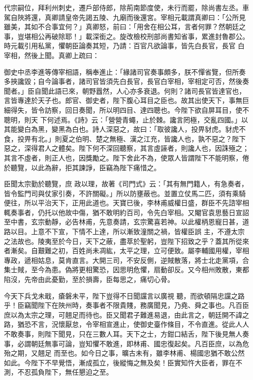 \begin{pinyinscope}
 代宗嗣位，拜利州刺史，遷戶部侍郎，除荊南節度使，未行而罷，除尚書左丞。車駕自陜將還，真卿請皇帝先謁五陵、九廟而後還宮。宰相元載謂真卿曰：「公所見雖美，其如不合事宜何？」真卿怒，前曰：「用舍在相公耳，言者何罪？然朝廷之事，豈堪相公再破除耶！」載深銜之。旋改檢校刑部尚書知省事，累進封魯郡公。時元載引用私黨，懼朝臣論奏其短，乃請：百官凡欲論事，皆先白長官，長官
 白宰相，然後上聞。真卿上疏曰：



 御史中丞李進等傳宰相語，稱奉進止：「緣諸司官奏事頗多，朕不憚省覽，但所奏多挾讒毀；自今論事者，諸司官皆須先白長官，長官白宰相，宰相定可否，然後奏聞者。」臣自聞此語已來，朝野囂然，人心亦多衰退。何則？諸司長官皆達官也，言皆專達於天子也。郎官、御史者，陛下腹心耳目之臣也。故其出使天下，事無巨細得失，皆令訪察，回日奏聞，所以明四目、達四聰也。今陛下欲自屏耳目，使不聰明，則天
 下何述焉。《詩》云：「營營青蠅，止於棘。讒言罔極，交亂四國。」以其能變白為黑，變黑為白也。詩人深惡之，故曰：「取彼讒人，投畀豺虎。豺虎不食，投畀有北。」則夏之伯明、楚之無極、漢之江充，皆讒人也，孰不惡之？陛下惡之，深得君人之體矣。陛下何不深回聽察，其言虛誣者，則讒人也，因誅殛之；其言不虛者，則正人也，因獎勵之。陛下舍此不為，使眾人皆謂陛下不能明察，倦於聽覽，以此為辭，拒其諫諍，臣竊為陛下痛惜之。



 臣聞太宗勤於聽覽，庶
 政以理，故著《司門式》云：「其有無門籍人，有急奏者，皆令監門司與仗家引奏，不許關礙。」所以防壅蔽也。並置立仗馬二匹，須有乘騎便往，所以平治天下，正用此道也。天寶已後，李林甫威權日盛，群臣不先諮宰相輒奏事者，仍托以他故中傷，猶不敢明約百司，令先白宰相。又閹官袁思藝日宣詔至中書，玄宗動靜，必告林甫，先意奏請，玄宗驚喜若神。以此權柄恩寵日甚，道路以目。上意不下宣，下情不上達，所以漸致潼關之禍，皆權臣誤
 主，不遵太宗之法故也。陵夷至於今日，天下之蔽，盡萃於聖躬，豈陛下招致之乎？蓋其所從來者漸矣。自艱難之初，百姓尚未凋紘，太平之理，立可便致。屬李輔國用權，宰相專政，遞相姑息，莫肯直言。大開三司，不安反側，逆賊散落，將士北走黨項，合集士賊，至今為患。偽將更相驚恐，因思明危懼，扇動卻反。又今相州敗散，東都陷沒，先帝由此憂勤，至於損壽，臣每思之，痛切心骨。



 今天下兵戈未戢，瘡磐未平，陛下豈得不日聞讜言以廣視
 聽，而欲頓隔忠讜之路乎！臣竊聞陛下在陜州時，奏事者不限貴賤，務廣聞見，乃堯、舜之事也。凡百臣庶以為太宗之理，可翹足而待也。臣又聞君子難進易退，由此言之，朝廷開不諱之路，猶恐不言，況懷厭怠，令宰相宣進止，使御史臺作條目，不令直進。從此人人不敢奏事，則陛下聞見，只在三數人耳。天下之士，方鉗口結舌，陛下後見無人奏事，必謂朝廷無事可論，豈知懼不敢進，即林甫、國忠復起矣。凡百臣庶，以為危殆之期，又翹足
 而至也。如今日之事，曠古未有，雖李林甫、楊國忠猶不敢公然如此。今陛下不早覺悟，漸成孤立，後縱悔之無及矣！臣實知忤大臣者，罪在不測，不忍孤負陛下，無任懇迫之至。




\end{pinyinscope}
